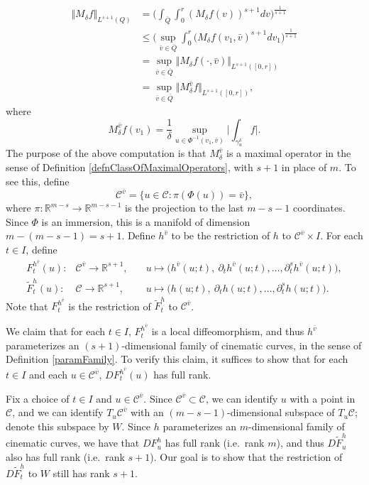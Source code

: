 \documentclass[letterpaper, reqno,11pt]{article}
\numberwithin{equation}{section}
\newcommand{\RR}{\mathbb{R}}
\numberwithin{thm}{section}
\theoremstyle{remark}
\begin{document}
\begin{equation}\label{slicingM}
\begin{split}
\big\Vert M_\delta f\big\Vert_{L^{s+1}(Q)}& =\Big(\int_{\bar Q}\int_0^r (M_\delta f(v))^{s+1}dv\Big)^{\frac{1}{s+1}}\\
&\leq \Big(\sup_{\bar v\in\bar Q}\int_0^r(M_\delta f( v_1, \bar v)^{s+1}dv_{1}\Big)^{\frac{1}{s+1}}\\
&=\sup_{\bar v\in\bar Q}\big\Vert M_\delta f(\cdot, \bar v)\big\Vert_{L^{s+1}([0,r])}\\
&=\sup_{\bar v\in\bar Q}\big\Vert M^{\bar v}_\delta f\big\Vert_{L^{s+1}([0,r])},
\end{split}
\end{equation}
where 
\[
M^{\bar v}_\delta f(v_1)=\frac{1}{\delta}\sup_{u\in \Phi^{-1}(v_1,\bar v)}\Big|\int_{\gamma_u^\delta} f\Big|.
\]
The purpose of the above computation is that $M^{\bar v}_\delta$ is a maximal operator in the sense of Definition \ref{defnClassOfMaximalOperators}, with $s+1$ in place of $m$. To see this, define 
\[
\mathcal{C}^{\bar v} = \{u\in\mathcal{C}\colon \pi(\Phi(u)) = \bar v\},
\]
where $\pi\colon\RR^{m-s}\to\RR^{m-s-1}$ is the projection to the last $m-s-1$ coordinates. Since $\Phi$ is an immersion, this is a manifold of dimension $m - (m-s-1) = s+1$. Define $h^{\bar v}$ to be the restriction of $h$ to $\mathcal{C}^{\bar v}\times I$. For each $t\in I$, define
\begin{equation*}
\begin{array}{lll}
F^{h^{\bar v}}_t(u)  \colon& \mathcal{C}^{\bar v}\to\RR^{s+1},\quad & u\mapsto \big(h^{\bar v}(u;t),\ \partial_t h^{\bar v}(u;t),\ldots,\partial_t^{s} h^{\bar v}(u;t)\big),\\
%
\tilde F^{h}_t(u)  \colon& \mathcal{C}\to\RR^{s+1},\ & u\mapsto \big(h(u;t),\ \partial_t h(u;t),\ldots,\partial_t^{s} h(u;t)\big).
\end{array}
\end{equation*}
Note that $F^{h^{\bar v}}_t$ is the restriction of $\tilde F^{h}_t$ to $\mathcal{C}^{\bar v}$. 

We claim that for each $t\in I$, $F^{h^{\bar v}}_t$ is a local diffeomorphism, and thus $h^{\bar v}$ parameterizes an $(s+1)$-dimensional family of cinematic curves, in the sense of Definition \ref{paramFamily}. To verify this claim, it suffices to show that for each $t\in I$ and each $u\in\mathcal{C}^{\bar v}$, $DF^{h^{\bar v}}_t(u)$ has full rank. 

Fix a choice of $t\in I$ and $u\in\mathcal{C}^{\bar v}$. Since $\mathcal{C}^{\bar v}\subset\mathcal{C}$, we can identify $u$ with a point in $\mathcal{C}$, and we can identify $T_u \mathcal{C}^{\bar v}$ with an $(m-s-1)$-dimensional subspace of $T_u\mathcal{C}$; denote this subspace by $W$. Since $h$ parameterizes an $m$-dimensional family of cinematic curves, we have that $DF^h_u$ has full rank (i.e.~rank $m$), and thus $D\tilde F^h_u$ also has full rank (i.e.~rank $s+1$). Our goal is to show that the restriction of $D\tilde F^{h}_t$ to $W$ still has rank $s+1$. 
\end{document}
